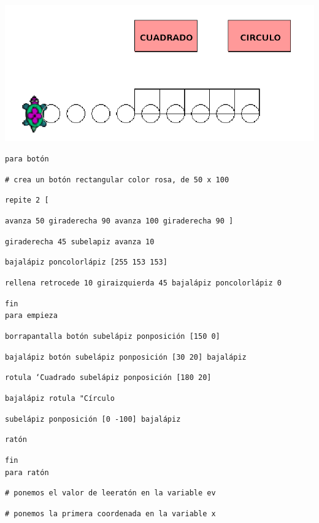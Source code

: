    \begin{center}
      \includegraphics[scale=0.6]{Imagenes/10_Usuario/CtrlRaton.png}
   \end{center}

\noindent \texttt{para bot\'on}

\noindent \texttt{\# crea un bot\'on rectangular color rosa, de 50 x 100}

\texttt{repite 2 [}

\texttt{avanza 50 giraderecha 90 avanza 100 giraderecha 90 ]}

\texttt{giraderecha 45 subelapiz avanza 10}

\texttt{bajal\'apiz poncolorl\'apiz [255 153 153]}

\texttt{rellena retrocede 10 giraizquierda 45 bajal\'apiz poncolorl\'apiz 0}

\noindent \texttt{fin} \\

\noindent \texttt{para empieza}

\texttt{borrapantalla bot\'on subel\'apiz ponposici\'on [150 0]}

\texttt{bajal\'apiz bot\'on subel\'apiz ponposici\'on [30 20] bajal\'apiz}

\texttt{rotula \char`\"{}Cuadrado subel\'apiz ponposici\'on [180 20]}

\texttt{bajal\'apiz rotula "C\'irculo}

\texttt{subel\'apiz ponposici\'on [0 -100] bajal\'apiz}

\texttt{rat\'on}

\noindent \texttt{fin} \\

\noindent \texttt{para rat\'on}

\noindent \texttt{\# ponemos el valor de leerat\'on en la variable ev}

\noindent \texttt{\# ponemos la primera coordenada en la variable x}

